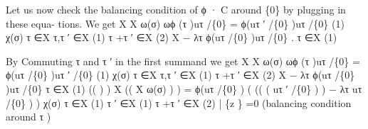 \documentclass[
  11pt,
]{article}
\newenvironment{Shaded}{}{}
\newcommand{\NormalTok}[1]{#1}
\begin{document}
\begin{Shaded}
\begin{Highlighting}[]
\NormalTok{Let us now check the balancing condition of ϕ · C around \{0\} by plugging in these equa{-}}
\NormalTok{tions. We get}
\NormalTok{               X                           X       ω(σ)}
\NormalTok{                      ωϕ (τ )uτ /\{0\} =                  ϕ(uτ ′ /\{0\} )uτ /\{0\}}
\NormalTok{                  (1)}
\NormalTok{                                                   χ(σ)}
\NormalTok{               τ ∈X                               τ,τ ′ ∈X (1)}
\NormalTok{                                                 τ +τ ′ ∈X (2)}
\NormalTok{                                                      X}
\NormalTok{                                                 −              λτ ϕ(uτ /\{0\} )uτ /\{0\} .}
\NormalTok{                                                     τ ∈X (1)}

\NormalTok{By Commuting τ and τ ′ in the first summand we get}
\NormalTok{ X                           X        ω(σ)}
\NormalTok{       ωϕ (τ )uτ /\{0\} =                    ϕ(uτ /\{0\} )uτ ′ /\{0\}}
\NormalTok{   (1)}
\NormalTok{                                      χ(σ)}
\NormalTok{τ ∈X                          τ,τ ′ ∈X (1)}
\NormalTok{                             τ +τ ′ ∈X (2)}
\NormalTok{                                  X}
\NormalTok{                             −              λτ ϕ(uτ /\{0\} )uτ /\{0\}}
\NormalTok{                                 τ ∈X (1)}
\NormalTok{                                                      ((                                    )            )}
\NormalTok{                               X                    ((           X          ω(σ)           )              )}
\NormalTok{                        =               ϕ(uτ /\{0\} ) (}
\NormalTok{                                                    ((}
\NormalTok{                                                      (                          uτ ′ /\{0\} )}
\NormalTok{                                                                                           ) − λτ uτ /\{0\} )}
\NormalTok{                                                                                                          )}
\NormalTok{                                                                            χ(σ)}
\NormalTok{                             τ ∈X (1)                         τ ′ ∈X (1)}
\NormalTok{                                                            τ +τ ′ ∈X (2)}
\NormalTok{                                                      |                            \{z                    \}}
\NormalTok{                                                                    =0 (balancing condition around τ )}

\end{Highlighting}
\end{Shaded}
\end{document}
